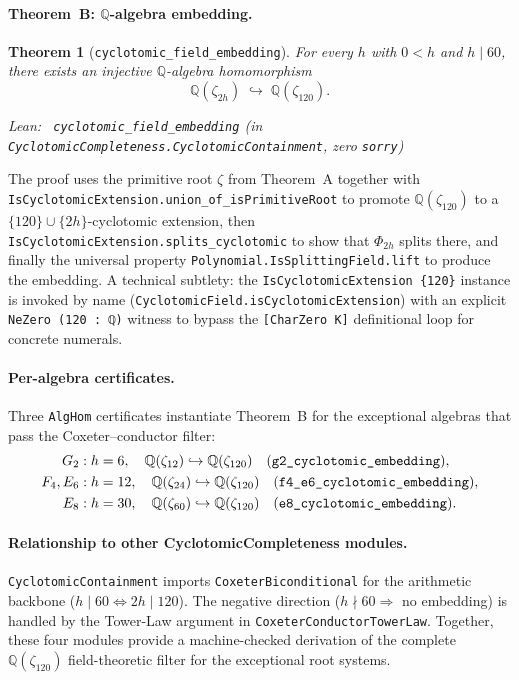 \documentclass[11pt,a4paper]{article}
\newenvironment{leanref}%
  {\par\smallskip\noindent\begingroup\raggedright\textup{Lean:}~}%
  {\par\endgroup}
\newtheorem{theorem}{Theorem}[section]
\theoremstyle{definition}
\begin{document}
\paragraph{Theorem~B: $\mathbb{Q}$-algebra embedding.}
\begin{theorem}[\texttt{cyclotomic\_field\_embedding}]
\label{thm:cyclo_alg_emb}
For every $h$ with $0 < h$ and $h \mid 60$, there exists an injective
$\mathbb{Q}$-algebra homomorphism
\[
  \mathbb{Q}(\zeta_{2h}) \;\hookrightarrow\; \mathbb{Q}(\zeta_{120}).
\]
\begin{leanref}
\lstinline|cyclotomic_field_embedding|
\textup{(in \texttt{CyclotomicCompleteness.CyclotomicContainment}, zero \texttt{sorry})}
\end{leanref}
\end{theorem}

The proof uses the primitive root $\zeta$ from Theorem~A together with
\lstinline|IsCyclotomicExtension.union_of_isPrimitiveRoot| to promote
$\mathbb{Q}(\zeta_{120})$ to a $\{120\} \cup \{2h\}$-cyclotomic extension,
then \lstinline|IsCyclotomicExtension.splits_cyclotomic| to show that
$\Phi_{2h}$ splits there, and finally the universal property
\lstinline|Polynomial.IsSplittingField.lift| to produce the embedding.
A technical subtlety: the \lstinline|IsCyclotomicExtension {120}| instance
is invoked by name (\lstinline|CyclotomicField.isCyclotomicExtension|)
with an explicit \lstinline|NeZero (120 : ℚ)| witness to bypass the
\lstinline|[CharZero K]| definitional loop for concrete numerals.

\paragraph{Per-algebra certificates.}
Three \lstinline|AlgHom| certificates instantiate Theorem~B for the
exceptional algebras that pass the Coxeter--conductor filter:
\begin{align*}
  G_2 &: h = 6, \quad \mathbb{Q}(\zeta_{12}) \hookrightarrow \mathbb{Q}(\zeta_{120})
  \quad \text{(\texttt{g2\_cyclotomic\_embedding})},\\
  F_4, E_6 &: h = 12, \quad \mathbb{Q}(\zeta_{24}) \hookrightarrow \mathbb{Q}(\zeta_{120})
  \quad \text{(\texttt{f4\_e6\_cyclotomic\_embedding})},\\
  E_8 &: h = 30, \quad \mathbb{Q}(\zeta_{60}) \hookrightarrow \mathbb{Q}(\zeta_{120})
  \quad \text{(\texttt{e8\_cyclotomic\_embedding})}.
\end{align*}

\paragraph{Relationship to other CyclotomicCompleteness modules.}
\texttt{CyclotomicContainment} imports \texttt{CoxeterBiconditional} for the
arithmetic backbone ($h \mid 60 \iff 2h \mid 120$).
The negative direction ($h \nmid 60 \Rightarrow$ no embedding) is handled
by the Tower-Law argument in \texttt{CoxeterConductorTowerLaw}.
Together, these four modules provide a machine-checked derivation of the
complete $\mathbb{Q}(\zeta_{120})$ field-theoretic filter for the
exceptional root systems.
\end{document}
